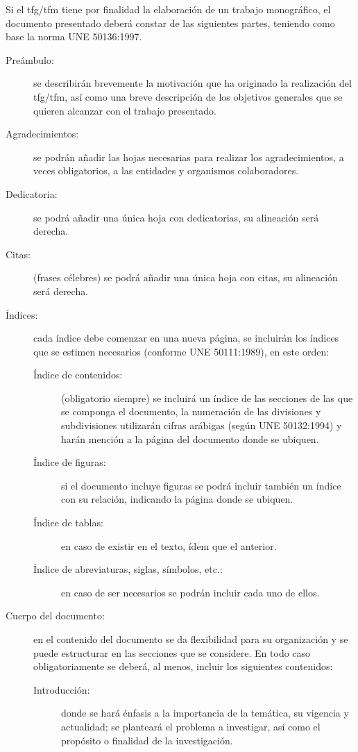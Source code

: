 Si el \gls{tfg}/\gls{tfm} tiene por finalidad la elaboración de un trabajo monográfico, el 
documento presentado deberá constar de las siguientes partes, teniendo como base la 
norma UNE 50136:1997.

\begin{description}
\item[Preámbulo:] se describirán brevemente la motivación que ha originado la realización del \gls{tfg}/\gls{tfm}, así como una breve descripción de los objetivos generales que se quieren alcanzar con el trabajo presentado.
\item[Agradecimientos:] se podrán añadir las hojas necesarias para realizar los agradecimientos, a veces obligatorios, a las entidades y organismos colaboradores.
\item[Dedicatoria:] se podrá añadir una única hoja con dedicatorias, su alineación será derecha.
\item[Citas:] (frases célebres) se podrá añadir una única hoja con citas, su alineación será derecha.
\item[Índices:] cada índice debe comenzar en una nueva página, se incluirán los índices que se estimen necesarios (conforme UNE 50111:1989), en este orden:
\begin{description}
\item[Índice de contenidos:] (obligatorio siempre) se incluirá un índice de las secciones de las que se componga el documento, la numeración de las 
divisiones y subdivisiones utilizarán cifras arábigas (según UNE 50132:1994) y harán mención a la página del documento donde se ubiquen.
\item[Índice de figuras:] si el documento incluye figuras se podrá incluir también un índice con su relación, indicando la página donde se ubiquen.
\item[Índice de tablas:] en caso de existir en el texto, ídem que el anterior.
\item[Índice de abreviaturas, siglas, símbolos, etc.:] en caso de ser necesarios se podrán incluir cada uno de ellos.
\end{description}
\item[Cuerpo del documento:] en el contenido del documento se da flexibilidad para su organización y se puede estructurar en las secciones que se considere. En todo caso obligatoriamente se deberá, al menos, incluir los siguientes contenidos:
\begin{description}
\item[Introducción:] donde se hará énfasis a la importancia de la temática, su vigencia y actualidad; se planteará el problema a investigar, así como el propósito o finalidad de la investigación.

\end{description}
\end{description}
